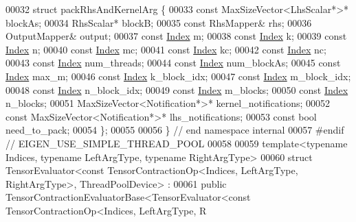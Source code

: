 \begin{DoxyCode}
00032 \textcolor{keyword}{struct }packRhsAndKernelArg \{
00033   \textcolor{keyword}{const} MaxSizeVector<LhsScalar*>* blockAs;
00034   RhsScalar* blockB;
00035   \textcolor{keyword}{const} RhsMapper& rhs;
00036   OutputMapper& output;
00037   \textcolor{keyword}{const} \hyperlink{namespace_eigen_a62e77e0933482dafde8fe197d9a2cfde}{Index} m;
00038   \textcolor{keyword}{const} \hyperlink{namespace_eigen_a62e77e0933482dafde8fe197d9a2cfde}{Index} k;
00039   \textcolor{keyword}{const} \hyperlink{namespace_eigen_a62e77e0933482dafde8fe197d9a2cfde}{Index} n;
00040   \textcolor{keyword}{const} \hyperlink{namespace_eigen_a62e77e0933482dafde8fe197d9a2cfde}{Index} mc;
00041   \textcolor{keyword}{const} \hyperlink{namespace_eigen_a62e77e0933482dafde8fe197d9a2cfde}{Index} kc;
00042   \textcolor{keyword}{const} \hyperlink{namespace_eigen_a62e77e0933482dafde8fe197d9a2cfde}{Index} nc;
00043   \textcolor{keyword}{const} \hyperlink{namespace_eigen_a62e77e0933482dafde8fe197d9a2cfde}{Index} num\_threads;
00044   \textcolor{keyword}{const} \hyperlink{namespace_eigen_a62e77e0933482dafde8fe197d9a2cfde}{Index} num\_blockAs;
00045   \textcolor{keyword}{const} \hyperlink{namespace_eigen_a62e77e0933482dafde8fe197d9a2cfde}{Index} max\_m;
00046   \textcolor{keyword}{const} \hyperlink{namespace_eigen_a62e77e0933482dafde8fe197d9a2cfde}{Index} k\_block\_idx;
00047   \textcolor{keyword}{const} \hyperlink{namespace_eigen_a62e77e0933482dafde8fe197d9a2cfde}{Index} m\_block\_idx;
00048   \textcolor{keyword}{const} \hyperlink{namespace_eigen_a62e77e0933482dafde8fe197d9a2cfde}{Index} n\_block\_idx;
00049   \textcolor{keyword}{const} \hyperlink{namespace_eigen_a62e77e0933482dafde8fe197d9a2cfde}{Index} m\_blocks;
00050   \textcolor{keyword}{const} \hyperlink{namespace_eigen_a62e77e0933482dafde8fe197d9a2cfde}{Index} n\_blocks;
00051   MaxSizeVector<Notification*>* kernel\_notifications;
00052   \textcolor{keyword}{const} MaxSizeVector<Notification*>* lhs\_notifications;
00053   \textcolor{keyword}{const} \textcolor{keywordtype}{bool} need\_to\_pack;
00054 \};
00055 
00056 \}  \textcolor{comment}{// end namespace internal}
00057 \textcolor{preprocessor}{#endif  // EIGEN\_USE\_SIMPLE\_THREAD\_POOL}
00058 
00059 \textcolor{keyword}{template}<\textcolor{keyword}{typename} Indices, \textcolor{keyword}{typename} LeftArgType, \textcolor{keyword}{typename} RightArgType>
00060 \textcolor{keyword}{struct }TensorEvaluator<const TensorContractionOp<Indices, LeftArgType, RightArgType>, ThreadPoolDevice> :
00061     \textcolor{keyword}{public} TensorContractionEvaluatorBase<TensorEvaluator<const TensorContractionOp<Indices, LeftArgType, R

\end{DoxyCode}
